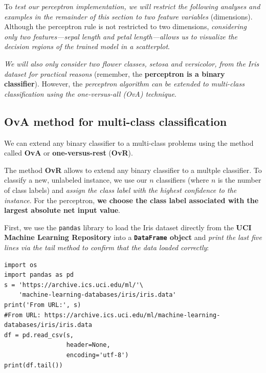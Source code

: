 \documentclass[../machine_learning_scikit.tex]{subfiles}
\begin{document}
    \begin{obs}
        To \textit{test our perceptron implementation, we will restrict the following analyses and examples in the remainder of this section to two feature variables} (dimensions). Although the perceptron rule is not restricted to two dimensions, \textit{considering only two features—sepal length and petal length—allows us to visualize the decision regions of the trained model in a scatterplot}.
    \end{obs}

    \begin{idea}
        \textit{We will also only consider two flower classes, setosa and versicolor, from the Iris dataset for practical reasons} (remember, the \textbf{perceptron is a binary classifier}). However, the \textit{perceptron algorithm can be extended to multi-class classification using the one-versus-all (OvA) technique}.
    \end{idea}

    \subsection{OvA method for multi-class classification}

    We can extend any binary classifier to a multi-class problems using the method called \textbf{OvA} or \textbf{one-versus-rest} (\textbf{OvR}).

    \begin{mydef}
        The method \textbf{OvR} allows to extend any binary classifier to a multple classifier. To classify a new, unlabeled instance, we use our $n$ classifiers (where $n$ is the number of class labels) and \textit{assign the class label with the highest confidence to the instance}. For the perceptron, \textbf{we choose the class label associated with the largest absolute net input value}.
    \end{mydef}

    First, we use the \lstinline|pandas| library to load the Iris dataset directly from the \textbf{UCI Machine Learning Repository} into a \textbf{\lstinline|DataFrame| object} and \textit{print the last five lines via the tail method to confirm that the data loaded correctly}:

    \begin{lstlisting}[caption={Read Dataset from UCI.},label={code:reading_dataset}]
import os
import pandas as pd
s = 'https://archive.ics.uci.edu/ml/'\
    'machine-learning-databases/iris/iris.data'
print('From URL:', s)
#From URL: https://archive.ics.uci.edu/ml/machine-learning-databases/iris/iris.data
df = pd.read_csv(s,
                 header=None,
                 encoding='utf-8')
print(df.tail())
    \end{lstlisting}
\end{document}

